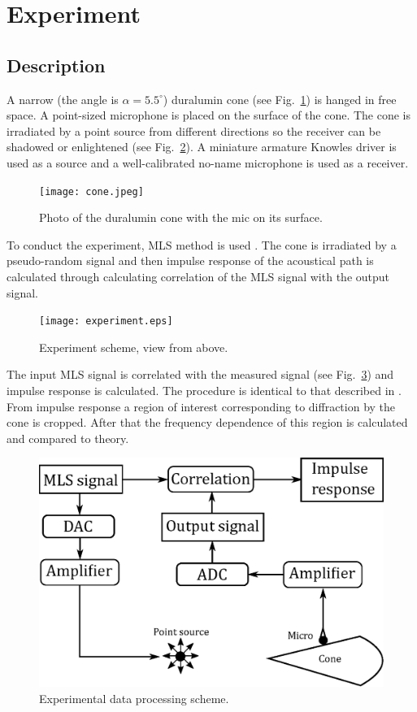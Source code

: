 \documentclass{procDDs}
\begin{document}
\section{Experiment}

\subsection{Description}
A narrow (the angle is $\alpha = 5.5 ^{\circ}$) duralumin cone (see Fig.~\ref{cone}) is hanged in free space. A point-sized microphone is placed on the surface of the cone. The cone is irradiated by a point source from different directions so the receiver can be shadowed or enlightened (see Fig.~\ref{exp_scheme}). A miniature armature Knowles driver is used as a source and a well-calibrated no-name microphone is used as a receiver. 

\begin{figure}[t!]\centering
	\texttt{[image: cone.jpeg]}
	\caption{Photo of the duralumin cone with the mic on its surface.}\label{cone}
\end{figure}


To conduct the experiment, MLS method is used \cite{Shanin}. The cone is irradiated by a pseudo-random signal and then impulse response of the acoustical path is calculated through calculating correlation of the MLS signal with the output signal.

\begin{figure}[t!]\centering
	\texttt{[image: experiment.eps]}
	\caption{Experiment scheme, view from above.}\label{exp_scheme}
\end{figure}

The input MLS signal is correlated with the measured signal (see Fig.~\ref{processing}) and impulse response is calculated. The procedure is identical to that described in \cite{Shanin}. From impulse response a region of interest corresponding to diffraction by the cone is cropped. After that the frequency dependence of this region is calculated and compared to theory.

\begin{figure}[t!]\centering
	\includegraphics[width=.48\textwidth]{processing.eps}
	\caption{Experimental data processing scheme.}\label{processing}
\end{figure}
\end{document}

